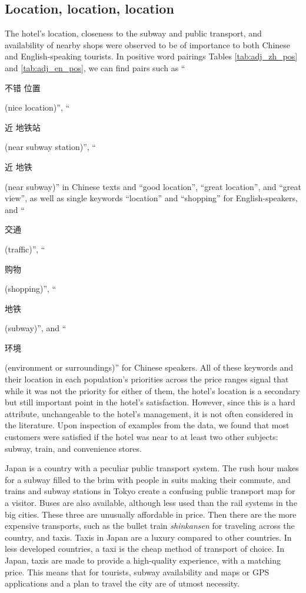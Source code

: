\documentclass[smallextended,natbib]{svjour3}       %
\begin{document}
  \subsection{Location, location, location}\label{disc:location}

    The hotel's location, closeness to the subway and public transport, and availability of nearby shops were observed to be of importance to both Chinese and English-speaking tourists. In positive word pairings Tables \ref{tab:adj_zh_pos} and \ref{tab:adj_en_pos}, we can find pairs such as ``\begin{CJK}{UTF8}{gbsn}不错 位置\end{CJK} (nice location)'', ``\begin{CJK}{UTF8}{gbsn}近 地铁站\end{CJK} (near subway station)'', ``\begin{CJK}{UTF8}{gbsn}近 地铁\end{CJK} (near subway)'' in Chinese texts and ``good location'', ``great location'', and ``great view'', as well as single keywords ``location'' and ``shopping'' for English-speakers, and ``\begin{CJK}{UTF8}{gbsn}交通\end{CJK} (traffic)'', ``\begin{CJK}{UTF8}{gbsn}购物\end{CJK} (shopping)'', ``\begin{CJK}{UTF8}{gbsn}地铁\end{CJK} (subway)'', and ``\begin{CJK}{UTF8}{gbsn}环境\end{CJK} (environment or surroundings)'' for Chinese speakers. All of these keywords and their location in each population's priorities across the price ranges signal that while it was not the priority for either of them, the hotel's location is a secondary but still important point in the hotel's satisfaction. However, since this is a hard attribute, unchangeable to the hotel's management, it is not often considered in the literature. Upon inspection of examples from the data, we found that most customers were satisfied if the hotel was near to at least two other subjects: subway, train, and convenience stores. 

    Japan is a country with a peculiar public transport system. The rush hour makes for a subway filled to the brim with people in suits making their commute, and trains and subway stations in Tokyo create a confusing public transport map for a visitor. Buses are also available, although less used than the rail systems in the big cities. These three are unusually affordable in price. Then there are the more expensive transports, such as the bullet train \textit{shinkansen} for traveling across the country, and taxis. Taxis in Japan are a luxury compared to other countries. In less developed countries, a taxi is the cheap method of transport of choice. In Japan, taxis are made to provide a high-quality experience, with a matching price. This means that for tourists, subway availability and maps or GPS applications and a plan to travel the city are of utmost necessity. 
\end{document}
